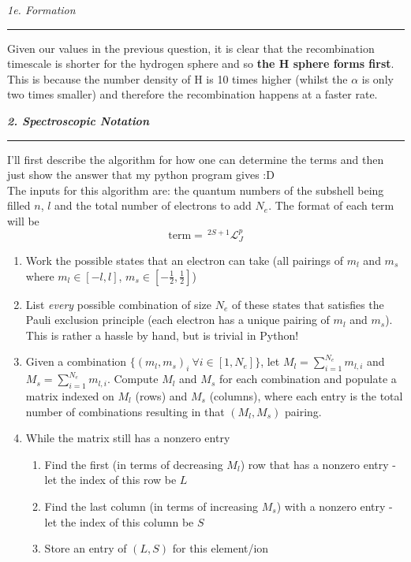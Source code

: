 \documentclass[12pt, letterpaper, twoside]{article}
\newcommand{\question}[1]{{\noindent \it #1}}
\newcommand{\answer}[1]{
    \par\noindent\rule{\textwidth}{0.4pt}#1\vspace{0.5cm}
}
\begin{document}
\question{1e. Formation}
\answer{
    Given our values in the previous question, it is clear that the recombination timescale is shorter for the hydrogen sphere and so \textbf{the H sphere forms first}. This is because the number density of H is 10 times higher (whilst the $\alpha$ is only two times smaller) and therefore the recombination happens at a faster rate.
}

\clearpage

\question{\textbf{2. Spectroscopic Notation}}

\answer{
    I'll first describe the algorithm for how one can determine the terms and then just show the answer that my python program gives :D\\

    \noindent The inputs for this algorithm are: the quantum numbers of the subshell being filled $n$, $l$ and the total number of electrons to add $N_e$. The format of each term will be
    \begin{equation}
        \mathrm{term} = \,^{2 S + 1}\mathcal{L}_{J}^p
    \end{equation}
    \begin{enumerate}
        \item Work the possible states that an electron can take (all pairings of $m_l$ and $m_s$ where $m_l \in [-l, l]$, $m_s \in [-\frac{1}{2}, \frac{1}{2}]$)
        \item List \textit{every} possible combination of size $N_e$ of these states that satisfies the Pauli exclusion principle (each electron has a unique pairing of $m_l$ and $m_s$). This is rather a hassle by hand, but is trivial in Python!
        \item Given a combination $\{(m_l, m_s)_i \ \forall i \in [1, N_e]\}$, let $M_l = \sum_{i = 1}^{N_e} m_{l, i}$ and $M_s = \sum_{i = 1}^{N_e} m_{l, i}$. Compute $M_l$ and $M_s$ for each combination and populate a matrix indexed on $M_l$ (rows) and $M_s$ (columns), where each entry is the total number of combinations resulting in that $(M_l, M_s)$ pairing.
        \item While the matrix still has a nonzero entry
        \begin{enumerate}
            \item Find the first (in terms of decreasing $M_l$) row that has a nonzero entry - let the index of this row be $L$
            \item Find the last column (in terms of increasing $M_s$) with a nonzero entry - let the index of this column be $S$
            \item Store an entry of $(L, S)$ for this element/ion

\end{enumerate}
\end{enumerate}}
\end{document}
